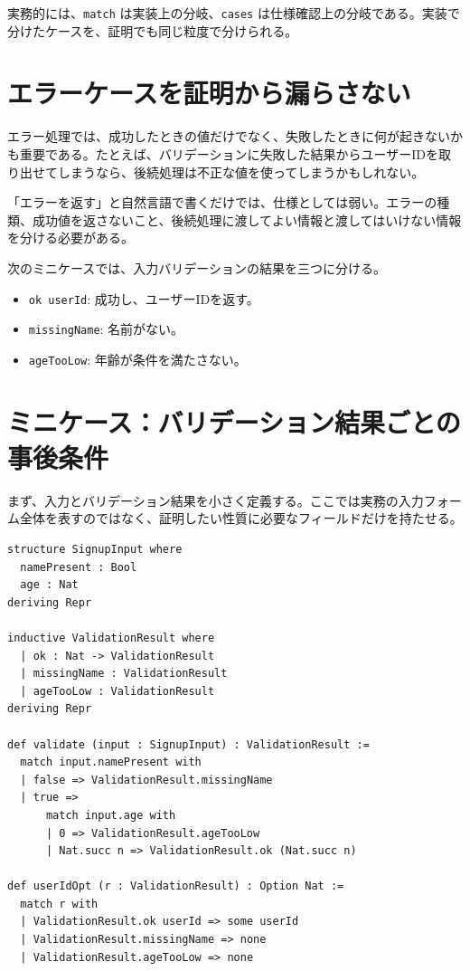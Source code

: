 実務的には、\texttt{match} は実装上の分岐、\texttt{cases} は仕様確認上の分岐である。実装で分けたケースを、証明でも同じ粒度で分けられる。

\section{エラーケースを証明から漏らさない}

エラー処理では、成功したときの値だけでなく、失敗したときに何が起きないかも重要である。たとえば、バリデーションに失敗した結果からユーザーIDを取り出せてしまうなら、後続処理は不正な値を使ってしまうかもしれない。

\begin{warningbox}
「エラーを返す」と自然言語で書くだけでは、仕様としては弱い。エラーの種類、成功値を返さないこと、後続処理に渡してよい情報と渡してはいけない情報を分ける必要がある。
\end{warningbox}

次のミニケースでは、入力バリデーションの結果を三つに分ける。

\begin{itemize}
\item \texttt{ok userId}: 成功し、ユーザーIDを返す。
\item \texttt{missingName}: 名前がない。
\item \texttt{ageTooLow}: 年齢が条件を満たさない。
\end{itemize}


\section{ミニケース：バリデーション結果ごとの事後条件}

まず、入力とバリデーション結果を小さく定義する。ここでは実務の入力フォーム全体を表すのではなく、証明したい性質に必要なフィールドだけを持たせる。

\begin{listing}[htbp]
\begin{verbatim}
structure SignupInput where
  namePresent : Bool
  age : Nat
deriving Repr

inductive ValidationResult where
  | ok : Nat -> ValidationResult
  | missingName : ValidationResult
  | ageTooLow : ValidationResult
deriving Repr

def validate (input : SignupInput) : ValidationResult :=
  match input.namePresent with
  | false => ValidationResult.missingName
  | true =>
      match input.age with
      | 0 => ValidationResult.ageTooLow
      | Nat.succ n => ValidationResult.ok (Nat.succ n)

def userIdOpt (r : ValidationResult) : Option Nat :=
  match r with
  | ValidationResult.ok userId => some userId
  | ValidationResult.missingName => none
  | ValidationResult.ageTooLow => none
\end{verbatim}
\caption{バリデーション入力と結果型}
\label{lst:ch13-validation-types}
\end{listing}

